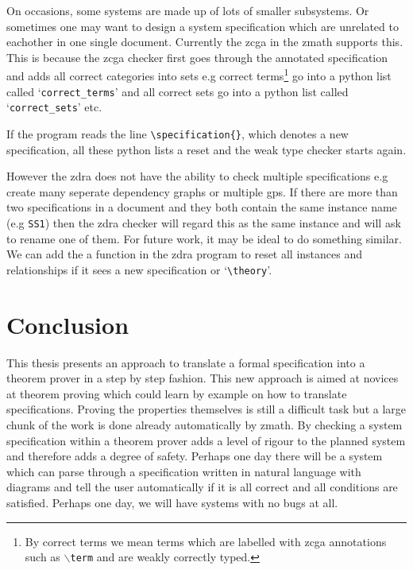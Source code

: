 On occasions, some systems are made up of lots of smaller subsystems. Or sometimes one may want to design a system specification which are unrelated to eachother in one single document. Currently the \gls{zcga} in the \gls{zmath} supports this. This is because the \gls{zcga} checker first goes through the annotated specification and adds all correct categories into sets e.g correct terms\footnote{By correct terms we mean terms which are labelled with \gls{zcga} annotations such as $\backslash$\texttt{term} and are weakly correctly typed.} go into a python list called `\texttt{correct\_terms}' and all correct sets go into a python list called `\texttt{correct\_sets}' etc. 


If the program reads the line \verb|\specification{}|, which denotes a new specification, all these python lists a reset and the weak type checker starts again.

However the \gls{zdra} does not have the ability to check multiple specifications e.g create many seperate dependency graphs or multiple \gls{gps}. If there are more than two specifications in a document and they both contain the same instance name (e.g \texttt{SS1}) then the \gls{zdra} checker will regard this as the same instance and will ask to rename one of them. For future work, it may be ideal to do something similar. We can add the a function in the \gls{zdra} program to reset all instances and relationships if it sees a new specification or `\verb|\theory|'.

\section{Conclusion}
\label{sec:conclusion}

This thesis presents an approach to translate a formal specification into a theorem prover in a step by step fashion. This new approach is aimed at novices at theorem proving which could learn by example on how to translate specifications. Proving the properties themselves is still a difficult task but a large chunk of the work is done already automatically by \gls{zmath}. By checking a system specification within a theorem prover adds a level of rigour to the planned system and therefore adds a degree of safety. Perhaps one day there will be a system which can parse through a specification written in natural language with diagrams and tell the user automatically if it is all correct and all conditions are satisfied. Perhaps one day, we will have systems with no bugs at all.